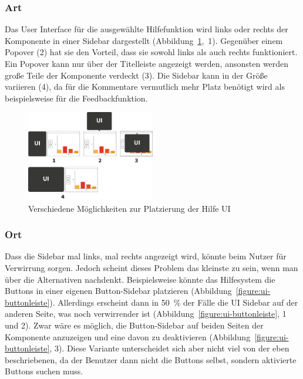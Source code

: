 \documentclass[
	headsepline,
	footsepline,
	fontsize=12pt,
	bibliography=totoc
]{scrbook}
\begin{document}
\subsubsection{Art}


Das User Interface für die ausgewählte Hilfefunktion wird links oder rechts der Komponente in einer Sidebar dargestellt (Abbildung~\ref{figure:ui-basics},~1). Gegenüber einem Popover (2) hat sie den Vorteil, dass sie sowohl links als auch rechts funktioniert. Ein Popover kann nur über der Titelleiste angezeigt werden, ansonsten werden große Teile der Komponente verdeckt (3). Die Sidebar kann in der Größe variieren (4), da für die Kommentare vermutlich mehr Platz benötigt wird als beispielsweise für die Feedbackfunktion.

\begin{figure}[htbp]
   \centering
   \includegraphics[width=0.5\textwidth]{images/konzeption-ui-basics.png}
   \caption{Verschiedene Möglichkeiten zur Platzierung der Hilfe UI}
   \label{figure:ui-basics}
\end{figure}

\subsubsection{Ort}
Dass die Sidebar mal links, mal rechts angezeigt wird, könnte beim Nutzer für Verwirrung sorgen. Jedoch scheint dieses Problem das kleinste zu sein, wenn man über die Alternativen nachdenkt.
Beispielsweise könnte das Hilfesystem die Buttons in einer eigenen Button-Sidebar platzieren (Abbildung~\ref{figure:ui-buttonleiste}). Allerdings erscheint dann in 50~\% der Fälle die UI Sidebar auf der anderen Seite, was noch verwirrender ist (Abbildung~\ref{figure:ui-buttonleiste}, 1 und 2). Zwar wäre es möglich, die Button-Sidebar auf beiden Seiten der Komponente anzuzeigen und eine davon zu deaktivieren (Abbildung~\ref{figure:ui-buttonleiste}, 3). Diese Variante unterscheidet sich aber nicht viel von der eben beschriebenen, da der Benutzer dann nicht die Buttons selbst, sondern aktivierte Buttons suchen muss.
\end{document}
